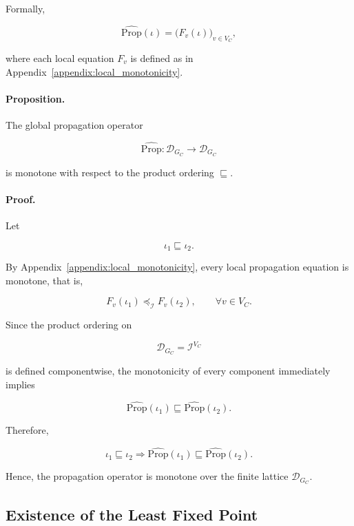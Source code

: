 \documentclass[10pt]{article}
\begin{document}
Formally,

\begin{equation}
	\label{eq:global_operator}
	\widehat{\mathrm{Prop}}(\iota)
	=
	\bigl(
	F_v(\iota)
	\bigr)_{v\in V_C},
\end{equation}

where each local equation $F_v$ is defined as in
Appendix~\ref{appendix:local_monotonicity}.

\paragraph{Proposition.}
The global propagation operator

\[
\widehat{\mathrm{Prop}}
:
\mathcal D_{G_C}
\rightarrow
\mathcal D_{G_C}
\]

is monotone with respect to the product ordering
$\sqsubseteq$.

\paragraph{Proof.}

Let

\[
\iota_1
\sqsubseteq
\iota_2.
\]

By Appendix~\ref{appendix:local_monotonicity}, every local propagation equation is monotone, that is,

\[
F_v(\iota_1)
\preceq_{\mathcal I}
F_v(\iota_2),
\qquad
\forall v\in V_C.
\]

Since the product ordering on

\[
\mathcal D_{G_C}
=
\mathcal I^{V_C}
\]

is defined componentwise, the monotonicity of every component immediately implies

\[
\widehat{\mathrm{Prop}}(\iota_1)
\sqsubseteq
\widehat{\mathrm{Prop}}(\iota_2).
\]

Therefore,

\begin{equation}
	\label{eq:global_monotonicity}
	\iota_1
	\sqsubseteq
	\iota_2
	\Longrightarrow
	\widehat{\mathrm{Prop}}(\iota_1)
	\sqsubseteq
	\widehat{\mathrm{Prop}}(\iota_2).
\end{equation}

Hence, the propagation operator is monotone over the finite lattice
$\mathcal D_{G_C}$.

\subsection{Existence of the Least Fixed Point}
\end{document}
